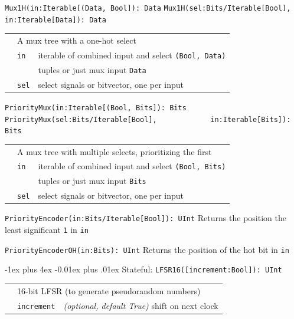 \documentclass[10pt,landscape]{article}
\makeatletter
\renewcommand{\subsection}{\@startsection{subsection}{2}{0mm}%
                                {-1ex plus 4ex}%
                                {-0.01ex plus .01ex}%
                                {\normalfont\normalsize\bfseries}}
\makeatother
\begin{document}
\begin{multicols}{3}
\verb$Mux1H(in:Iterable[(Data, Bool]): Data$ \newline
\verb$Mux1H(sel:Bits/Iterable[Bool],$ \newline
\verb$      in:Iterable[Data]): Data$ \newline
\begin{tabular}{l l l}
& \multicolumn{2}{l}{A mux tree with a one-hot select} \\
& \verb$in$ & iterable of combined input and select \verb$(Bool, Data)$ \\
& & tuples or just mux input \verb$Data$ \\
& \verb$sel$ & select signals or bitvector, one per input \\
\end{tabular}

\verb$PriorityMux(in:Iterable[(Bool, Bits]): Bits$ \newline
\verb$PriorityMux(sel:Bits/Iterable[Bool],$ \newline
\verb$            in:Iterable[Bits]): Bits$ \newline
\begin{tabular}{l l l}
& \multicolumn{2}{l}{A mux tree with multiple selects, prioritizing the first} \\
& \verb$in$ & iterable of combined input and select \verb$(Bool, Bits)$ \\
& & tuples or just mux input \verb$Bits$ \\
& \verb$sel$ & select signals or bitvector, one per input \\
\end{tabular}

\verb$PriorityEncoder(in:Bits/Iterable[Bool]): UInt$ \newline
\phantom{x} Returns the position the least significant \verb$1$ in \verb$in$

\verb$PriorityEncoderOH(in:Bits): UInt$ \newline
\phantom{x} Returns the position of the hot bit in \verb$in$

\subsection{Stateful}: \newline
\verb$LFSR16([increment:Bool]): UInt$ \newline
\begin{tabular}{l l l}
& \multicolumn{2}{l}{16-bit LFSR (to generate pseudorandom numbers)} \\
& \verb$increment$ & {\em(optional, default True)} shift on next clock \\
\end{tabular}


\end{multicols}
\end{document}
